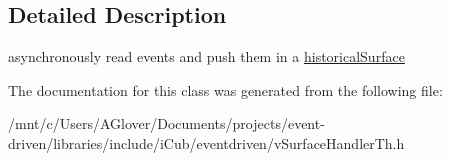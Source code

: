 \subsection{Detailed Description}
asynchronously read events and push them in a \hyperlink{classev_1_1historicalSurface}{historical\+Surface} 

The documentation for this class was generated from the following file\+:\begin{DoxyCompactItemize}
\item 
/mnt/c/\+Users/\+A\+Glover/\+Documents/projects/event-\/driven/libraries/include/i\+Cub/eventdriven/v\+Surface\+Handler\+Th.\+h\end{DoxyCompactItemize}
